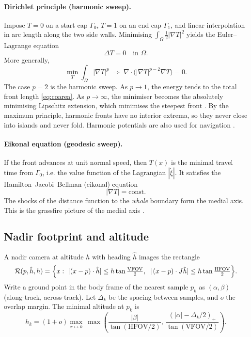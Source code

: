 \documentclass[11pt,a4paper]{article}
\numberwithin{equation}{section}
\theoremstyle{plain}
\theoremstyle{definition}
\theoremstyle{remark}
\newcommand{\HFOV}{\mathrm{HFOV}}
\newcommand{\VFOV}{\mathrm{VFOV}}
\begin{document}
\paragraph{Dirichlet principle (harmonic sweep).} Impose $T=0$ on a start cap $\Gamma_0$, $T=1$ on an end cap $\Gamma_1$, and linear interpolation in arc length along the two side walls. Minimising $\int_\Omega\tfrac12|\nabla T|^2$ yields the Euler--Lagrange equation
\begin{equation}
\Delta T = 0 \quad\text{in }\Omega .
\label{eq:laplace}
\end{equation}
More generally,
\begin{equation}
\min_T\int_\Omega|\nabla T|^p \;\Longrightarrow\; \nabla\cdot\bigl(|\nabla T|^{p-2}\nabla T\bigr)=0 .
\label{eq:plaplace}
\end{equation}
The case $p=2$ is the harmonic sweep. As $p\to1$, the energy tends to the total front length \eqref{eq:coarea}. As $p\to\infty$, the minimiser becomes the absolutely minimising Lipschitz extension, which minimises the steepest front \citep{aronsson1967}. By the maximum principle, harmonic fronts have no interior extrema, so they never close into islands and never fold. Harmonic potentials are also used for navigation \citep{connolly1990}.

\paragraph{Eikonal equation (geodesic sweep).} If the front advances at unit normal speed, then $T(x)$ is the minimal travel time from $\Gamma_0$, i.e. the value function of the Lagrangian $|\dot\xi|$. It satisfies the Hamilton--Jacobi--Bellman (eikonal) equation \citep{bryson1975,sethian1999}
\begin{equation}
|\nabla T| = \text{const}.
\label{eq:eikonal}
\end{equation}
The shocks of the distance function to the \emph{whole} boundary form the medial axis. This is the grassfire picture of the medial axis \citep{blum1967,kimia1995}.

\subsection{Nadir footprint and altitude}

A nadir camera at altitude $h$ with heading $\hat h$ images the rectangle
\begin{equation}
\mathcal R(p,\hat h,h)=\Bigl\{x:\ |(x-p)\cdot\hat h|\le h\tan\tfrac{\VFOV}{2},\ \ |(x-p)\cdot J\hat h|\le h\tan\tfrac{\HFOV}{2}\Bigr\}.
\label{eq:footprint}
\end{equation}
Write a ground point in the body frame of the nearest sample $p_k$ as $(\alpha,\beta)$ (along-track, across-track). Let $\Delta_k$ be the spacing between samples, and $o$ the overlap margin. The minimal altitude at $p_k$ is
\begin{equation}
h_k=(1+o)\max_{x\mapsto k}\ \max\!\left(\frac{|\beta|}{\tan(\HFOV/2)},\ \frac{(|\alpha|-\Delta_k/2)_+}{\tan(\VFOV/2)}\right).
\label{eq:altitude}
\end{equation}
\end{document}
